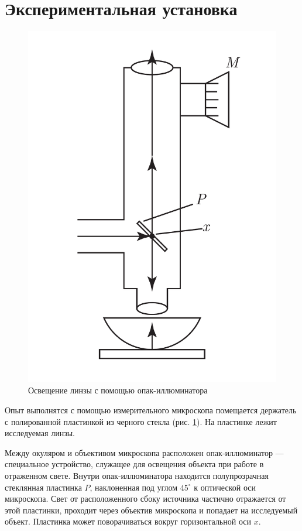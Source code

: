 \documentclass[a4paper, 12pt]{article}
\begin{document}
	\section{Экспериментальная установка}
	\begin{figure}
		\centering
		\includegraphics[scale=0.19]{Microscope.pdf}
		\caption{Освещение линзы с помощью опак-иллюминатора}
		\label{lense_illumination}
	\end{figure}
	Опыт выполнятся с помощью измерительного микроскопа помещается держатель с полированной пластинкой из черного стекла (рис. \ref{lense_illumination}). На пластинке лежит исследуемая линзы.\par
	Между окуляром и объективом микроскопа расположен опак-иллюминатор — специальное устройство, служащее для освещения объекта при работе в отраженном свете. Внутри опак-иллюминатора находится полупрозрачная стеклянная пластинка $P$, наклоненная под углом $45^\circ$ к оптической оси микроскопа. Свет от расположенного сбоку источника частично отражается от этой пластинки, проходит через объектив микроскопа и попадает на исследуемый объект. Пластинка может поворачиваться вокруг горизонтальной оси $x$.\par
\end{document}
